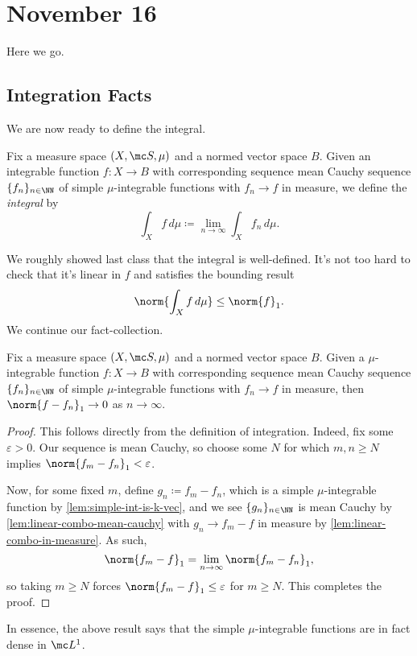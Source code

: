 \documentclass[../notes.tex]{subfiles}
\begin{document}
\section{November 16}

Here we go.

\subsection{Integration Facts}
We are now ready to define the integral.
\begin{definition}[Integral]
	Fix a measure space $(X,\mc S,\mu)$ and a normed vector space $B$. Given an integrable function $f\colon X\to B$ with corresponding sequence mean Cauchy sequence $\{f_n\}_{n\in\NN}$ of simple $\mu$-integrable functions with $f_n\to f$ in measure, we define the \textit{integral} by
	\[\int_Xf\,d\mu\coloneqq\lim_{n\to\infty}\int_Xf_n\,d\mu.\]
\end{definition}
We roughly showed last class that the integral is well-defined. It's not too hard to check that it's linear in $f$ and satisfies the bounding result
\[\norm{\int_Xf\,d\mu}\le\norm{f}_1.\]
We continue our fact-collection.
\begin{lemma} \label{lem:simple-int-are-dense}
	Fix a measure space $(X,\mc S,\mu)$ and a normed vector space $B$. Given a $\mu$-integrable function $f\colon X\to B$ with corresponding sequence mean Cauchy sequence $\{f_n\}_{n\in\NN}$ of simple $\mu$-integrable functions with $f_n\to f$ in measure, then $\norm{f-f_n}_1\to0$ as $n\to\infty$.
\end{lemma}
\begin{proof}
	This follows directly from the definition of integration. Indeed, fix some $\varepsilon>0$. Our sequence is mean Cauchy, so choose some $N$ for which $m,n\ge N$ implies $\norm{f_m-f_n}_1<\varepsilon$.
	
	Now, for some fixed $m$, define $g_n\coloneqq f_m-f_n$, which is a simple $\mu$-integrable function by \autoref{lem:simple-int-is-k-vec}, and we see $\{g_n\}_{n\in\NN}$ is mean Cauchy by \autoref{lem:linear-combo-mean-cauchy} with $g_n\to f_m-f$ in measure by \autoref{lem:linear-combo-in-measure}. As such,
	\[\norm{f_m-f}_1=\lim_{n\to\infty}\norm{f_m-f_n}_1,\]
	so taking $m\ge N$ forces $\norm{f_m-f}_1\le\varepsilon$ for $m\ge N$. This completes the proof.
\end{proof}
\begin{remark}
	In essence, the above result says that the simple $\mu$-integrable functions are in fact dense in $\mc L^1$.
\end{remark}
\end{document}
